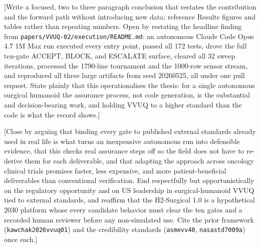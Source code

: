 
[Write a focused, two to three paragraph conclusion that restates the contribution
and the forward path without introducing new data; reference Results figures and
tables rather than repeating numbers. Open by restating the headline finding from
\texttt{papers/VVUQ-02/execution/README.md}: an autonomous Claude Code Opus 4.7 1M
Max run executed every entry point, passed all 172 tests, drove the full ten-gate
ACCEPT, BLOCK, and ESCALATE surface, cleared all 32 sweep iterations, processed the
1790-line tournament and the 1000-row sensor stream, and reproduced all three large
artifacts from seed 20260525, all under one pull request. State plainly that this
operationalises the thesis: for a single autonomous surgical humanoid the assurance
process, not code generation, is the substantial and decision-bearing work, and
holding VVUQ to a higher standard than the code is what the record shows.]

[Close by arguing that binding every gate to published external standards already
used in real life is what turns an inexpensive autonomous run into defensible
evidence, that this checks real assurance steps off so the field does not have to
re-derive them for each deliverable, and that adapting the approach across oncology
clinical trials promises faster, less expensive, and more patient-beneficial
deliverables than conventional verification. End respectfully but opportunistically
on the regulatory opportunity and on US leadership in surgical-humanoid VVUQ tied to
external standards, and reaffirm that the H2-Surgical 1.0 is a hypothetical 2030
platform whose every candidate behavior must clear the ten gates and a recorded
human reviewer before any non-simulated use. Cite the prior framework
(\texttt{kawchak2026vvuq01}) and the credibility standards (\texttt{asmevv40},
\texttt{nasastd7009a}) once each.]
